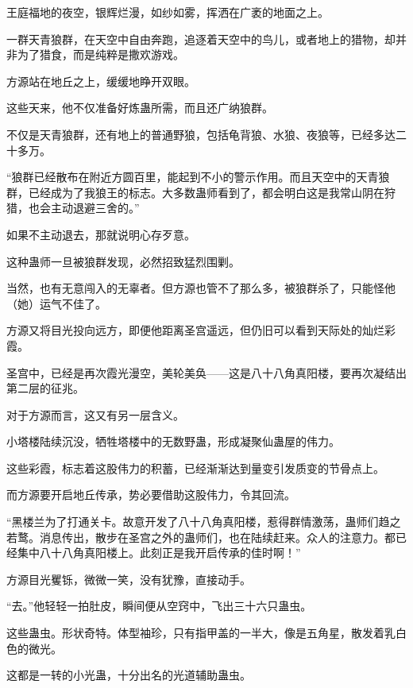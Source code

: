 
\begin{this_body}



王庭福地的夜空，银辉烂漫，如纱如雾，挥洒在广袤的地面之上。

一群天青狼群，在天空中自由奔跑，追逐着天空中的鸟儿，或者地上的猎物，却并非为了猎食，而是纯粹是撒欢游戏。

方源站在地丘之上，缓缓地睁开双眼。

这些天来，他不仅准备好炼蛊所需，而且还广纳狼群。

不仅是天青狼群，还有地上的普通野狼，包括龟背狼、水狼、夜狼等，已经多达二十多万。

“狼群已经散布在附近方圆百里，能起到不小的警示作用。而且天空中的天青狼群，已经成为了我狼王的标志。大多数蛊师看到了，都会明白这是我常山阴在狩猎，也会主动退避三舍的。”

如果不主动退去，那就说明心存歹意。

这种蛊师一旦被狼群发现，必然招致猛烈围剿。

当然，也有无意闯入的无辜者。但方源也管不了那么多，被狼群杀了，只能怪他（她）运气不佳了。

方源又将目光投向远方，即便他距离圣宫遥远，但仍旧可以看到天际处的灿烂彩霞。

圣宫中，已经是再次霞光漫空，美轮美奂——这是八十八角真阳楼，要再次凝结出第二层的征兆。

对于方源而言，这又有另一层含义。

小塔楼陆续沉没，牺牲塔楼中的无数野蛊，形成凝聚仙蛊屋的伟力。

这些彩霞，标志着这股伟力的积蓄，已经渐渐达到量变引发质变的节骨点上。

而方源要开启地丘传承，势必要借助这股伟力，令其回流。

“黑楼兰为了打通关卡。故意开发了八十八角真阳楼，惹得群情激荡，蛊师们趋之若鹜。消息传出，散步在圣宫之外的蛊师们，也在陆续赶来。众人的注意力。都已经集中八十八角真阳楼上。此刻正是我开启传承的佳时啊！”

方源目光矍铄，微微一笑，没有犹豫，直接动手。

“去。”他轻轻一拍肚皮，瞬间便从空窍中，飞出三十六只蛊虫。

这些蛊虫。形状奇特。体型袖珍，只有指甲盖的一半大，像是五角星，散发着乳白色的微光。

这都是一转的小光蛊，十分出名的光道辅助蛊虫。


\end{this_body}
